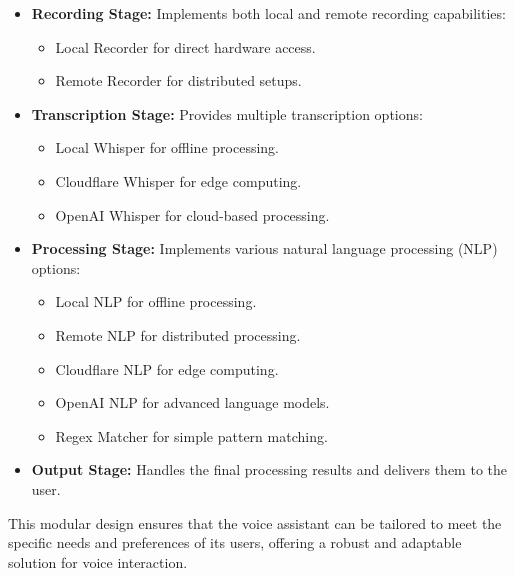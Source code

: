 \begin{itemize}
    \item \textbf{Recording Stage:} Implements both local and remote recording capabilities:
    \begin{itemize}
        \item Local Recorder for direct hardware access.
        \item Remote Recorder for distributed setups.
    \end{itemize}
    \item \textbf{Transcription Stage:} Provides multiple transcription options:
    \begin{itemize}
        \item Local Whisper for offline processing.
        \item Cloudflare Whisper for edge computing.
        \item OpenAI Whisper for cloud-based processing.
    \end{itemize}
    \item \textbf{Processing Stage:} Implements various natural language processing (NLP) options:
    \begin{itemize}
        \item Local NLP for offline processing.
        \item Remote NLP for distributed processing.
        \item Cloudflare NLP for edge computing.
        \item OpenAI NLP for advanced language models.
        \item Regex Matcher for simple pattern matching.
    \end{itemize}
    \item \textbf{Output Stage:} Handles the final processing results and delivers them to the user.
\end{itemize}

This modular design ensures that the voice assistant can be tailored
to meet the specific needs and preferences of its users,
offering a robust and adaptable solution for voice interaction.

